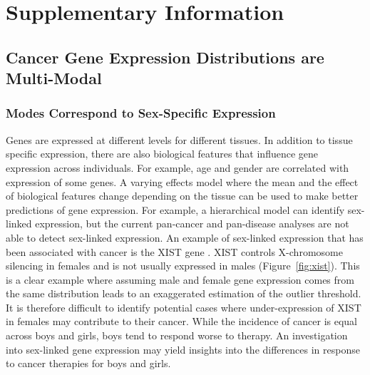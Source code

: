 \documentclass[fleqn,10pt]{wlscirep}
\newcommand{\figref}[1]{Figure~\ref{fig:#1}}
\newcommand{\beginsupplement}{%
        \setcounter{table}{0}
        \renewcommand{\thetable}{S\arabic{table}}%
        \setcounter{figure}{0}
        \renewcommand{\thefigure}{S\arabic{figure}}%
     }
\begin{document}
\beginsupplement
\section*{Supplementary Information}

\subsection*{Cancer Gene Expression Distributions are Multi-Modal}
\subsubsection*{Modes Correspond to Sex-Specific Expression}
Genes are expressed at different levels for different tissues. In addition to tissue specific expression, there are also biological features that influence gene expression across individuals. For example, age and gender are correlated with expression of some genes. A varying effects model where the mean and the effect of biological features change depending on the tissue can be used to make better predictions of gene expression. For example, a hierarchical model can identify sex-linked expression, but the current pan-cancer and pan-disease analyses are not able to detect sex-linked expression. An example of sex-linked expression that has been associated with cancer is the XIST gene \cite{yildirim2013xist}. XIST controls X-chromosome silencing in females and is not usually expressed in males (\figref{xist}). This is a clear example where assuming male and female gene expression comes from the same distribution leads to an exaggerated estimation of the outlier threshold. It is therefore difficult to identify potential cases where under-expression of XIST in females may contribute to their cancer. While the incidence of cancer is equal across boys and girls, boys tend to respond worse to therapy. An investigation into sex-linked gene expression may yield insights into the differences in response to cancer therapies for boys and girls. 

\end{document}
